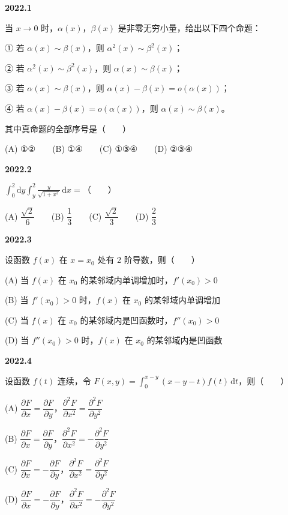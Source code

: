 \documentclass[UTF8,12pt,fontset=windows]{ctexart}
\begin{document}
{\large\bfseries 2022.1}

当 $x \to 0$ 时，$\alpha(x)$，$\beta(x)$ 是非零无穷小量，给出以下四个命题：

① 若 $\alpha(x) \sim \beta(x)$，则 $\alpha^2(x) \sim \beta^2(x)$；

② 若 $\alpha^2(x) \sim \beta^2(x)$，则 $\alpha(x) \sim \beta(x)$；

③ 若 $\alpha(x) \sim \beta(x)$，则 $\alpha(x) - \beta(x) = o(\alpha(x))$；

④ 若 $\alpha(x) - \beta(x) = o(\alpha(x))$，则 $\alpha(x) \sim \beta(x)$。

其中真命题的全部序号是（　　）

(A) ①②　　(B) ①④　　(C) ①③④　　(D) ②③④

\vfill
\newpage
{\large\bfseries 2022.2}

$\int_{0}^{2}\mathrm{d}y\int_{y}^{2}\frac{y}{\sqrt{1+x^3}}\,\mathrm{d}x =$（　　）

(A) $\dfrac{\sqrt{2}}{6}$　　(B) $\dfrac{1}{3}$　　(C) $\dfrac{\sqrt{2}}{3}$　　(D) $\dfrac{2}{3}$

\vfill
\newpage
{\large\bfseries 2022.3}

设函数 $f(x)$ 在 $x = x_0$ 处有 2 阶导数，则（　　）

(A) 当 $f(x)$ 在 $x_0$ 的某邻域内单调增加时，$f'(x_0) > 0$

(B) 当 $f'(x_0) > 0$ 时，$f(x)$ 在 $x_0$ 的某邻域内单调增加

(C) 当 $f(x)$ 在 $x_0$ 的某邻域内是凹函数时，$f''(x_0) > 0$

(D) 当 $f''(x_0) > 0$ 时，$f(x)$ 在 $x_0$ 的某邻域内是凹函数

\vfill
\newpage
{\large\bfseries 2022.4}

设函数 $f(t)$ 连续，令 $F(x,y) = \int_{0}^{x-y}(x-y-t)f(t)\,\mathrm{d}t$，则（　　）

(A) $\dfrac{\partial F}{\partial x} = \dfrac{\partial F}{\partial y}$，$\dfrac{\partial^2 F}{\partial x^2} = \dfrac{\partial^2 F}{\partial y^2}$

(B) $\dfrac{\partial F}{\partial x} = \dfrac{\partial F}{\partial y}$，$\dfrac{\partial^2 F}{\partial x^2} = -\dfrac{\partial^2 F}{\partial y^2}$

(C) $\dfrac{\partial F}{\partial x} = -\dfrac{\partial F}{\partial y}$，$\dfrac{\partial^2 F}{\partial x^2} = \dfrac{\partial^2 F}{\partial y^2}$

(D) $\dfrac{\partial F}{\partial x} = -\dfrac{\partial F}{\partial y}$，$\dfrac{\partial^2 F}{\partial x^2} = -\dfrac{\partial^2 F}{\partial y^2}$
\end{document}
